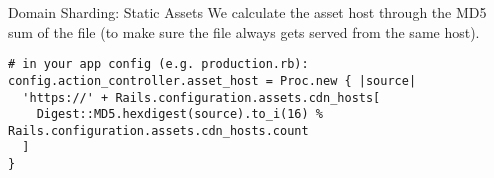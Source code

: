 \documentclass{beamer}
\begin{document}
\begin{frame}[fragile]{Domain Sharding: Static Assets}
We calculate the asset host through the MD5 sum of the file (to make sure the file always gets served from the same host).
\begin{lstlisting}
# in your app config (e.g. production.rb):
config.action_controller.asset_host = Proc.new { |source|
  'https://' + Rails.configuration.assets.cdn_hosts[
    Digest::MD5.hexdigest(source).to_i(16) % Rails.configuration.assets.cdn_hosts.count
  ]
}
\end{lstlisting}
\end{frame}
\end{document}
